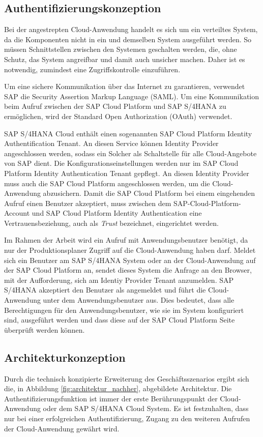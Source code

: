 % 
% 
% 
% 
% 
% 
\subsection{Authentifizierungskonzeption}
Bei der angestrepten Cloud-Anwendung handelt es sich um ein verteiltes System, da die Komponenten nicht in ein und demselben System ausgeführt werden. So müssen Schnittstellen zwischen den Systemen geschalten werden, die, ohne Schutz, das System angreifbar und damit auch unsicher machen. Daher ist es notwendig, zumindest eine Zugriffskontrolle einzuführen. 
\autocite{Hammerschall.2005}

Um eine sichere Kommunikation über das Internet zu garantieren, verwendet SAP die Security Assertion Markup Language (SAML). Um eine Kommunikation beim Aufruf zwischen der SAP Cloud Platform und SAP S/4HANA zu ermöglichen, wird der Standard Open Authorization (OAuth) verwendet.
\autocite{Schneider.2018}

SAP S/4HANA Cloud enthält einen sogenannten SAP Cloud Platform Identity Authentification Tenant. An diesen Service können Identity Provider angeschlossen werden, sodass ein Solcher als Schaltstelle für alle Cloud-Angebote von SAP dient. Die Konfigurationseinstellungen werden nur im SAP Cloud Platform Identity Authentication Tenant gepflegt. An diesen Identity Provider muss auch die SAP Cloud Platform angeschlossen werden, um die Cloud-Anwendung abzusichern. Damit die SAP Cloud Platform bei einem eingehenden Aufruf einen Benutzer akzeptiert, muss zwischen dem SAP-Cloud-Platform-Account und SAP Cloud Platform Identity Authentication eine Vertrauensbeziehung, auch als \textit{Trust} bezeichnet, eingerichtet werden.

Im Rahmen der Arbeit wird ein Aufruf mit Anwendungsbenutzer benötigt, da nur der Produktionsplaner Zugriff auf die Cloud-Anwendung haben darf. Meldet sich ein Benutzer am SAP S/4HANA System oder an der Cloud-Anwendung auf der SAP Cloud Platform an, sendet dieses System die Anfrage an den Browser, mit der Aufforderung, sich am Identiy Provider Tenant anzumelden. SAP S/4HANA akzeptiert den Benutzer als angemeldet und führt die Cloud-Anwendung unter dem Anwendungsbenutzer aus. Dies bedeutet, dass alle Berechtigungen für den Anwendungsbenutzer, wie sie im System konfiguriert sind, ausgeführt werden und dass diese auf der SAP Cloud Platform Seite überprüft werden können. \autocite{Schneider.2018}
% 
% 
% 
% 
% 
% 
\subsection{Architekturkonzeption}
Durch die technisch konzipierte Erweiterung des Geschäftsszenarios ergibt sich die, in Abbildung \ref{fig:architektur_nachher}, abgebildete Architektur. Die Authentifizierungsfunktion ist immer der erste Berührungspunkt der Cloud-Anwendung oder dem SAP S/4HANA Cloud System. Es ist festzuhalten, dass nur bei einer erfolgreichen Authentifizierung, Zugang zu den weiteren Aufrufen der Cloud-Anwendung gewährt wird.

